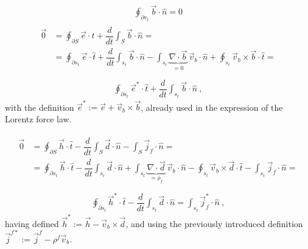 \documentclass[letterpaper,10pt,english]{jupyterBook}
\begin{document}
\sphinxAtStartPar
{}
\begin{equation*}
\begin{split}
    \oint_{\partial v_t} \vec{b} \cdot \hat{n} = 0
\end{split}
\end{equation*}
\sphinxAtStartPar
{}
\begin{equation*}
\begin{split}\begin{aligned}
   \vec{0} & = \oint_{\partial S} \vec{e} \cdot \hat{t} + \dfrac{d}{dt} \int_{S} \vec{b} \cdot \hat{n} = \\
    & = \oint_{\partial s_t} \vec{e} \cdot \hat{t} + \dfrac{d}{dt} \int_{s_t} \vec{b} \cdot \hat{n} - \int_{s_t} \underbrace{\nabla \cdot \vec{b}}_{=0} \, \vec{v}_b \cdot \hat{n} + \oint_{s_t} \vec{v}_b \times \vec{b} \cdot \hat{t} =  \\
\end{aligned}\end{split}
\end{equation*}\begin{equation*}
\begin{split}
    \oint_{\partial s_t} \vec{e}^* \cdot \hat{t} + \dfrac{d}{dt} \int_{s_t} \vec{b} \cdot \hat{n} \ ,
\end{split}
\end{equation*}
\sphinxAtStartPar
with the definition \(\vec{e}^* := \vec{e} + \vec{v}_b \times \vec{b}\), already used in the expression of the Lorentz force law.

\sphinxAtStartPar
{}
\begin{equation*}
\begin{split}\begin{aligned}
    \vec{0} & = \oint_{\partial S} \vec{h} \cdot \hat{t} - \dfrac{d}{dt} \int_{S} \vec{d} \cdot \hat{n} - \int_{S} \vec{j}_f \cdot \hat{n} = \\
    & = \oint_{\partial s_t} \vec{h} \cdot \hat{t} - \dfrac{d}{dt} \int_{s_t} \vec{d} \cdot \hat{n} + \int_{s_t} \underbrace{\nabla \cdot \vec{d}}_{=\rho_f} \, \vec{v}_b \cdot \hat{n} - \oint_{s_t} \vec{v}_b \times \vec{d} \cdot \hat{t} - \int_{s_t} \vec{j}_f \cdot \hat{n} =  \\
\end{aligned}\end{split}
\end{equation*}\begin{equation*}
\begin{split}
    \oint_{\partial s_t} \vec{h}^* \cdot \hat{t} - \dfrac{d}{dt} \int_{s_t} \vec{d} \cdot \hat{n} = \int_{s_t} \vec{j}_f^{*} \cdot \hat{n} \ ,
\end{split}
\end{equation*}
\sphinxAtStartPar
having defined \(\vec{h}^* := \vec{h} - \vec{v}_b \times \vec{d}\), and using the previously introduced definition \(\vec{j}^{f*} := \vec{j}^f - \rho^f \vec{v}_b\).
\end{document}
